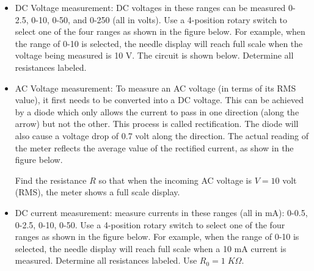 \begin{itemize}
\begin{enumerate}
  \begin{itemize}
  \item DC Voltage measurement: DC voltages in these ranges can be measured
    0-2.5, 0-10, 0-50, and 0-250 (all in volts). Use a 4-position rotary switch
    to select one of the four ranges as shown in the figure below. For example, 
    when the range of 0-10 is selected, the needle display will reach full scale 
    when the voltage being measured is 10 V. The circuit is shown below. Determine 
    all resistances labeled.


  \item AC Voltage measurement: To measure an AC voltage (in terms of its
    RMS value), it first needs to be converted into a DC voltage. This can 
    be achieved by a diode which only allows the current to pass in one
    direction (along the arrow) but not the other. This process is called
    rectification. The diode will also cause a voltage drop of 0.7 volt 
    along the direction. The actual reading of the meter reflects the 
    average value of the rectified current, as show in the figure below.

    Find the resistance $R$ so that when the incoming AC voltage is $V=10$ 
    volt (RMS), the meter shows a full scale display.





  \item DC current measurement: measure currents in these ranges (all in mA):
    0-0.5, 0-2.5, 0-10, 0-50. Use a 4-position rotary switch to select one 
    of the four ranges as shown in the figure below. For example, when the 
    range of 0-10 is selected, the needle display will reach full scale when 
    a 10 mA current is measured. Determine all resistances labeled. Use
    $R_0=1\;K\Omega$.


\end{itemize}
\end{enumerate}
\end{itemize}
